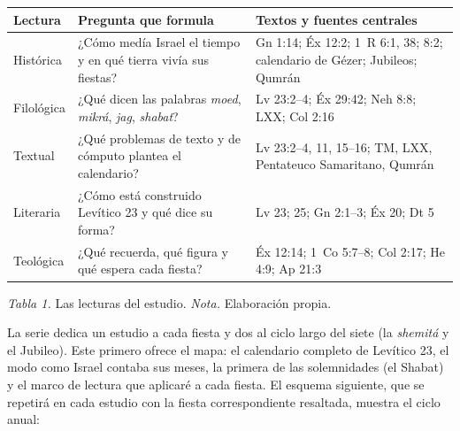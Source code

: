 \documentclass[11pt,letterpaper]{article}
\begin{document}
\begin{center}\small\renewcommand{\arraystretch}{1.2}
\begin{tabular}{@{}L{2.7cm}L{6.4cm}L{6.1cm}@{}}
\toprule
\textbf{Lectura} & \textbf{Pregunta que formula} & \textbf{Textos y fuentes centrales} \\ \midrule
Histórica & ¿Cómo medía Israel el tiempo y en qué tierra vivía sus fiestas? & Gn 1:14; Éx 12:2; 1~R 6:1, 38; 8:2; calendario de Gézer; Jubileos; Qumrán \\
Filológica & ¿Qué dicen las palabras \emph{moed}, \emph{mikrá}, \emph{jag}, \emph{shabat}? & Lv 23:2--4; Éx 29:42; Neh 8:8; LXX; Col 2:16 \\
Textual & ¿Qué problemas de texto y de cómputo plantea el calendario? & Lv 23:2--4, 11, 15--16; TM, LXX, Pentateuco Samaritano, Qumrán \\
Literaria & ¿Cómo está construido Levítico 23 y qué dice su forma? & Lv 23; 25; Gn 2:1--3; Éx 20; Dt 5 \\
Teológica & ¿Qué recuerda, qué figura y qué espera cada fiesta? & Éx 12:14; 1~Co 5:7--8; Col 2:17; He 4:9; Ap 21:3 \\
\bottomrule
\end{tabular}\par
{\footnotesize\color{sepia}\textit{Tabla 1.} Las lecturas del estudio. \textit{Nota.} Elaboración propia.}
\end{center}

La serie dedica un estudio a cada fiesta y dos al ciclo largo del siete (la \emph{shemitá} y el Jubileo). Este primero ofrece el mapa: el calendario completo de Levítico 23, el modo como Israel contaba sus meses, la primera de las solemnidades (el Shabat) y el marco de lectura que aplicaré a cada fiesta. El esquema siguiente, que se repetirá en cada estudio con la fiesta correspondiente resaltada, muestra el ciclo anual:
\end{document}
